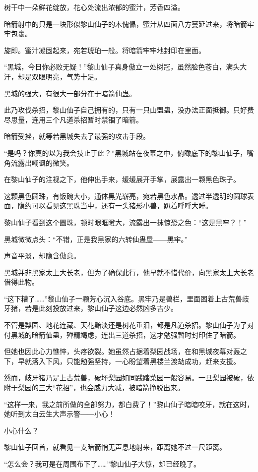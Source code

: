 \begin{this_body}
树干中一朵鲜花绽放，花心处流出浓郁的蜜汁，芳香四溢。

暗箭射中的只是一块形似黎山仙子的木傀儡，蜜汁从四面八方蔓延过来，将暗箭牢牢包裹。

旋即。蜜汁凝固起来，宛若琥珀一般。将暗箭牢牢地封印在里面。

“黑城，今日你必败无疑！”黎山仙子真身傲立一处树冠，虽然脸色苍白，满头大汗，却是双眼明亮，气势十足。

黑城的强大，有很大一部分在于暗箭仙蛊。

此乃攻伐杀招，黎山仙子自己拥有的，只有一只山盟蛊，没办法正面抵御。只好费尽思量，连用三个凡道杀招暂时禁锢了暗箭。

暗箭受挫，就等若黑城失去了最强的攻击手段。

“是吗？你真的以为我会技止于此？”黑城站在夜幕之中，俯瞰底下的黎山仙子，嘴角流露出嘲讽的微笑。

在黎山仙子的注视之下，他伸出手来，缓缓展开手掌，展露出一颗黑色珠子。

这颗黑色圆珠，有饭碗大小，通体黑光崭亮，宛若黑色水晶。透过半透明的圆球表面，隐约可以看见这黑珠当中，还有一头猪形小兽，趴着呼呼大睡。

黎山仙子看到这个圆珠，顿时眼眶瞪大，流露出一抹惊恐之色：“这是黑牢？！”

黑城微微点头：“不错，正是我黑家的六转仙蛊屋――黑牢。”

声音平淡，却隐含傲意。

黑城并非黑家太上大长老，但为了确保此行，他早就不惜代价，向黑家太上大长老借得此物。

“这下糟了……”黎山仙子一颗芳心沉入谷底。黑牢乃是兽栏，里面困着上古荒兽歧牙猪，若是此刻投放过来，黎山仙子这边必然凶多吉少。

不管是梨园、地花连藏、天花黯淡还是树花垂泪，都是凡道杀招。黎山仙子为了对付黑城的暗箭仙蛊，殚精竭虑，连出三道杀招，这才勉强暂时封印住了暗箭。

但她也因此心力憔悴，头疼欲裂。她虽然占据着梨园战场，在和黑城夜幕对轰之下，早就落入下风，只能勉强坚持，一心盼望着黑楼兰渡劫成功，赶来支援。

然而，歧牙猪乃是上古荒兽，破坏梨园如同践踏菜园一般容易。一旦梨园被破，依附于梨园的三大“花招”，也会威力大减，被暗箭挣脱出来。

“这样一来，我之前所做的全部努力，都白费了！”黎山仙子暗暗咬牙，就在这时，她听到太白云生大声示警――小心！

小心什么？

黎山仙子回首，就看见一支暗箭悄无声息地射来，距离她不过一尺距离。

“怎么会？我可是在周围布下了……”黎山仙子大惊，却已经晚了。


\end{this_body}
